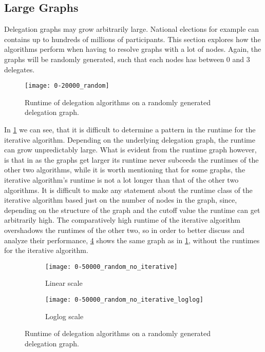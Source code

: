 \subsection{Large Graphs}

Delegation graphs may grow arbitrarily large. National elections for example can contains up to hundreds of millions of participants. This section explores how the algorithms perform when having to resolve graphs with a lot of nodes. Again, the graphs will be randomly generated, such that each nodes has between 0 and 3 delegates. 

\begin{figure}[t]
    \centering
    \texttt{[image: 0-20000\_random]}
    \caption{Runtime of delegation algorithms on a randomly generated delegation graph.}
    \label{fig:random-large}
\end{figure}

In \cref{fig:random-large} we can see, that it is difficult to determine a pattern in the runtime for the iterative algorithm. Depending on the underlying delegation graph, the runtime can grow unpredictably large. What is evident from the runtime graph however, is that in as the graphs get larger its runtime never subceeds the runtimes of the other two algorithms, while it is worth mentioning that for some graphs, the iterative algorithm's runtime is not a lot longer than that of the other two algorithms. It is difficult to make any statement about the runtime class of the iterative algorithm based just on the number of nodes in the graph, since, depending on the structure of the graph and the cutoff value the runtime can get arbitrarily high. The comparatively high runtime of the iterative algorithm overshadows the runtimes of the other two, so in order to better discuss and analyze their performance, \cref{fig:random-large-no-iterative} shows the same graph as in \cref{fig:random-large}, without the runtimes for the iterative algorithm.

\begin{figure}[t]
    \centering
    \begin{subfigure}[t]{0.45\textwidth}
        \centering
        \texttt{[image: 0-50000\_random\_no\_iterative]}
        \caption{Linear scale}
         \label{subfig:random-large-no-iterative-linear}
    \end{subfigure}
    \hfill
    \begin{subfigure}[t]{0.45\textwidth}
        \centering
        \texttt{[image: 0-50000\_random\_no\_iterative\_loglog]}
        \caption{Loglog scale}
         \label{subfig:random-large-no-iterative-loglog}
    \end{subfigure}
    \caption{Runtime of delegation algorithms on a randomly generated delegation graph.}
    \label{fig:random-large-no-iterative}
\end{figure}


